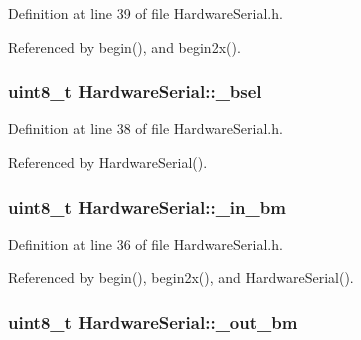 Definition at line 39 of file HardwareSerial.h.



Referenced by begin(), and begin2x().

\hypertarget{class_hardware_serial_acc6c13c76a56c8b4bb88c3385b7bc791}{
\subsubsection[{\_\-bsel}]{\setlength{\rightskip}{0pt plus 5cm}uint8\_\-t {\bf HardwareSerial::\_\-bsel}}}
\label{class_hardware_serial_acc6c13c76a56c8b4bb88c3385b7bc791}


Definition at line 38 of file HardwareSerial.h.



Referenced by HardwareSerial().

\hypertarget{class_hardware_serial_a8724fdfd3955eeff5d3ed535624ce79a}{
\subsubsection[{\_\-in\_\-bm}]{\setlength{\rightskip}{0pt plus 5cm}uint8\_\-t {\bf HardwareSerial::\_\-in\_\-bm}}}
\label{class_hardware_serial_a8724fdfd3955eeff5d3ed535624ce79a}


Definition at line 36 of file HardwareSerial.h.



Referenced by begin(), begin2x(), and HardwareSerial().

\hypertarget{class_hardware_serial_a751a284e15af72b026143a8091be1b70}{
\subsubsection[{\_\-out\_\-bm}]{\setlength{\rightskip}{0pt plus 5cm}uint8\_\-t {\bf HardwareSerial::\_\-out\_\-bm}}}
\label{class_hardware_serial_a751a284e15af72b026143a8091be1b70}


